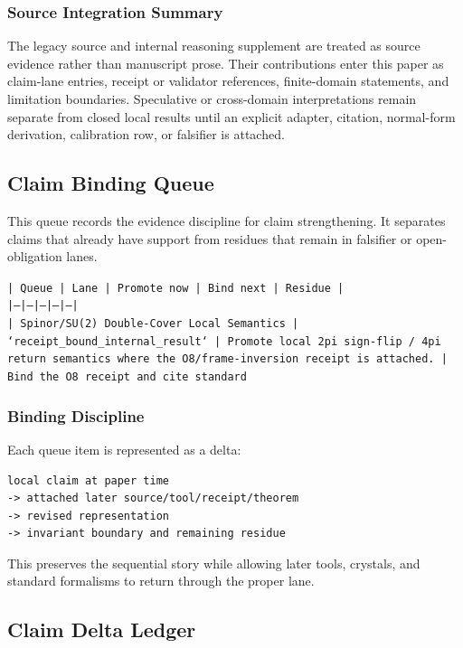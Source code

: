 \documentclass[11pt]{article}
\begin{document}
\subsubsection*{Source Integration Summary}

The legacy source and internal reasoning supplement are treated as source
evidence rather than manuscript prose. Their contributions enter this paper as
claim-lane entries, receipt or validator references, finite-domain statements,
and limitation boundaries. Speculative or cross-domain interpretations remain
separate from closed local results until an explicit adapter, citation,
normal-form derivation, calibration row, or falsifier is attached.
\subsection*{Claim Binding Queue}

This queue records the evidence discipline for claim strengthening. It separates claims that already have support from residues that remain in falsifier or open-obligation lanes.

\noindent\texttt{| Queue | Lane | Promote now | Bind next | Residue |}\\
\noindent\texttt{|---|---|---|---|---|}\\
\noindent\texttt{| Spinor/SU(2) Double-Cover Local Semantics | `receipt\_bound\_internal\_result` | Promote local 2pi sign-flip / 4pi return semantics where the O8/frame-inversion receipt is attached. | Bind the O8 receipt and cite standard}\\

\subsubsection*{Binding Discipline}

Each queue item is represented as a delta:

\begin{verbatim}
local claim at paper time
-> attached later source/tool/receipt/theorem
-> revised representation
-> invariant boundary and remaining residue
\end{verbatim}

This preserves the sequential story while allowing later tools, crystals, and
standard formalisms to return through the proper lane.

\subsection*{Claim Delta Ledger}
\end{document}
